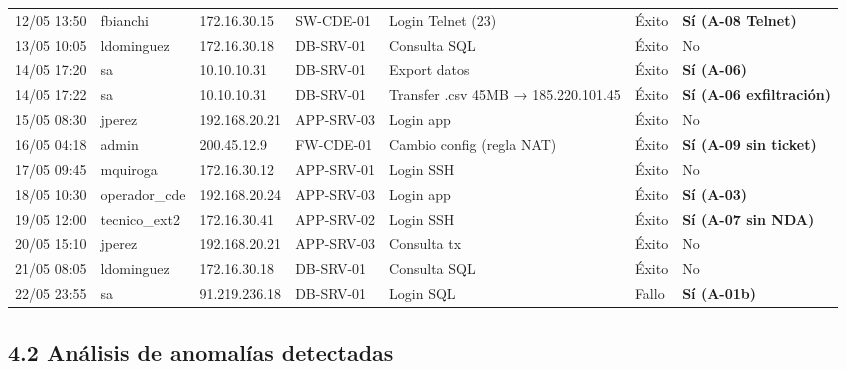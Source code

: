 \documentclass[11pt,a4paper]{article}
\begin{document}
\begin{longtable}{P{1.5cm}P{1.8cm}P{2.2cm}P{2cm}P{1.5cm}P{1.5cm}L}
12/05 13:50 & fbianchi & 172.16.30.15 & SW-CDE-01 & Login Telnet (23) & Éxito & \textbf{Sí (A-08 Telnet)} \\
13/05 10:05 & ldominguez & 172.16.30.18 & DB-SRV-01 & Consulta SQL & Éxito & No \\
14/05 17:20 & sa & 10.10.10.31 & DB-SRV-01 & Export datos & Éxito & \textbf{Sí (A-06)} \\
14/05 17:22 & sa & 10.10.10.31 & DB-SRV-01 & Transfer .csv 45MB → 185.220.101.45 & Éxito & \textbf{Sí (A-06 exfiltración)} \\
15/05 08:30 & jperez & 192.168.20.21 & APP-SRV-03 & Login app & Éxito & No \\
16/05 04:18 & admin & 200.45.12.9 & FW-CDE-01 & Cambio config (regla NAT) & Éxito & \textbf{Sí (A-09 sin ticket)} \\
17/05 09:45 & mquiroga & 172.16.30.12 & APP-SRV-01 & Login SSH & Éxito & No \\
18/05 10:30 & operador_cde & 192.168.20.24 & APP-SRV-03 & Login app & Éxito & \textbf{Sí (A-03)} \\
19/05 12:00 & tecnico_ext2 & 172.16.30.41 & APP-SRV-02 & Login SSH & Éxito & \textbf{Sí (A-07 sin NDA)} \\
20/05 15:10 & jperez & 192.168.20.21 & APP-SRV-03 & Consulta tx & Éxito & No \\
21/05 08:05 & ldominguez & 172.16.30.18 & DB-SRV-01 & Consulta SQL & Éxito & No \\
22/05 23:55 & sa & 91.219.236.18 & DB-SRV-01 & Login SQL & Fallo & \textbf{Sí (A-01b)} \\
\bottomrule
\end{longtable}

\subsection{4.2 Análisis de anomalías detectadas}
\end{document}
